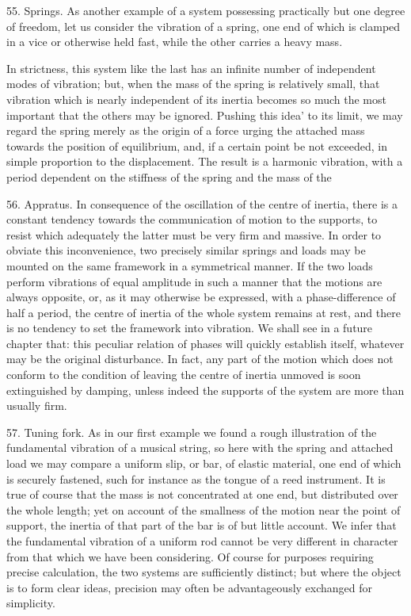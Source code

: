 55. Springs.  As another example of a system possessing practically but one
degree of freedom, let us consider the vibration of a spring, one end of which
is clamped in a vice or otherwise held fast, while the other carries a heavy
mass.

In strictness, this system like the last has an infinite number of independent
modes of vibration; but, when the mass of the spring is relatively small, that
vibration which is nearly independent of its inertia becomes so much the most
important that the others may be ignored. Pushing this idea' to its limit, we
may regard the spring merely as the origin of a force urging the attached mass
towards the position of equilibrium, and, if a certain point be not exceeded,
in simple proportion to the displacement. The result is a harmonic vibration,
with a period dependent on the stiffness of the spring and the mass of the

56. Appratus. In consequence of the oscillation of the centre of inertia, there is a
constant tendency towards the communication of motion to the supports, to
resist which adequately the latter must be very firm and massive. In order to
obviate this inconvenience, two precisely similar springs and loads may be
mounted on the same framework in a symmetrical manner. If the two loads perform
vibrations of equal amplitude in such a manner that the motions are always
opposite, or, as it may otherwise be expressed, with a phase-difference of half
a period, the centre of inertia of the whole system remains at rest, and there
is no tendency to set the framework into vibration. We shall see in a future
chapter that: this peculiar relation of phases will quickly establish itself,
whatever may be the original disturbance. In fact, any part of the motion which
does not conform to the condition of leaving the centre of inertia unmoved is
soon extinguished by damping, unless indeed the supports of the system are more
than usually firm.

57. Tuning fork. As in our first example we found a rough illustration of the fundamental
vibration of a musical string, so here with the spring and attached load we may
compare a uniform slip, or bar, of elastic material, one end of which is
securely fastened, such for instance as the tongue of a reed instrument. It is
true of course that the mass is not concentrated at one end, but distributed
over the whole length; yet on account of the smallness of the motion near the
point of support, the inertia of that part of the bar is of but little account.
We infer that the fundamental vibration of a uniform rod cannot be very
different in character from that which we have been considering. Of course for
purposes requiring precise calculation, the two systems are sufficiently
distinct; but where the object is to form clear ideas, precision may often be
advantageously exchanged for simplicity.

